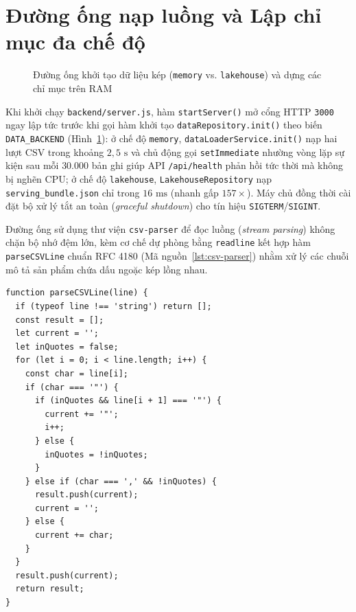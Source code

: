 \section{Đường ống nạp luồng và Lập chỉ mục đa chế độ}
\label{sec:ch3-pipeline}
\begin{figure}[H]
	\centering
	\caption{Đường ống khởi tạo dữ liệu kép (\texttt{memory} vs. \texttt{lakehouse}) và dựng các chỉ mục trên RAM}
	\label{fig:data_pipeline}
\end{figure}

Khi khởi chạy \texttt{backend/server.js}, hàm \texttt{startServer()} mở cổng HTTP \texttt{3000} ngay lập tức trước khi gọi hàm khởi tạo \texttt{dataRepository.init()} theo biến \texttt{DATA_BACKEND} (Hình~\ref{fig:data_pipeline}): ở chế độ \texttt{memory}, \texttt{dataLoaderService.init()} nạp hai lượt CSV trong khoảng $2{,}5\text{ s}$ và chủ động gọi \texttt{setImmediate} nhường vòng lặp sự kiện sau mỗi $30.000$ bản ghi giúp API \texttt{/api/health} phản hồi tức thời mà không bị nghẽn CPU; ở chế độ \texttt{lakehouse}, \texttt{LakehouseRepository} nạp \texttt{serving_bundle.json} chỉ trong $16\text{ ms}$ (nhanh gấp $157\times$). Máy chủ đồng thời cài đặt bộ xử lý tắt an toàn (\textit{graceful shutdown}) cho tín hiệu \texttt{SIGTERM}/\texttt{SIGINT}.

Đường ống sử dụng thư viện \texttt{csv-parser} để đọc luồng (\textit{stream parsing}) không chặn bộ nhớ đệm lớn, kèm cơ chế dự phòng bằng \texttt{readline} kết hợp hàm \texttt{parseCSVLine} chuẩn RFC 4180 (Mã nguồn~\ref{lst:csv-parser}) nhằm xử lý các chuỗi mô tả sản phẩm chứa dấu ngoặc kép lồng nhau.

\begin{listing}[H]
	\begin{verbatim}
function parseCSVLine(line) {
  if (typeof line !== 'string') return [];
  const result = [];
  let current = '';
  let inQuotes = false;
  for (let i = 0; i < line.length; i++) {
    const char = line[i];
    if (char === '"') {
      if (inQuotes && line[i + 1] === '"') {
        current += '"';
        i++;
      } else {
        inQuotes = !inQuotes;
      }
    } else if (char === ',' && !inQuotes) {
      result.push(current);
      current = '';
    } else {
      current += char;
    }
  }
  result.push(current);
  return result;
}
\end{verbatim}
	\caption{Bộ phân tách CSV chuẩn RFC 4180 trong \texttt{backend/utils/csvParser.js}}
	\label{lst:csv-parser}
\end{listing}

